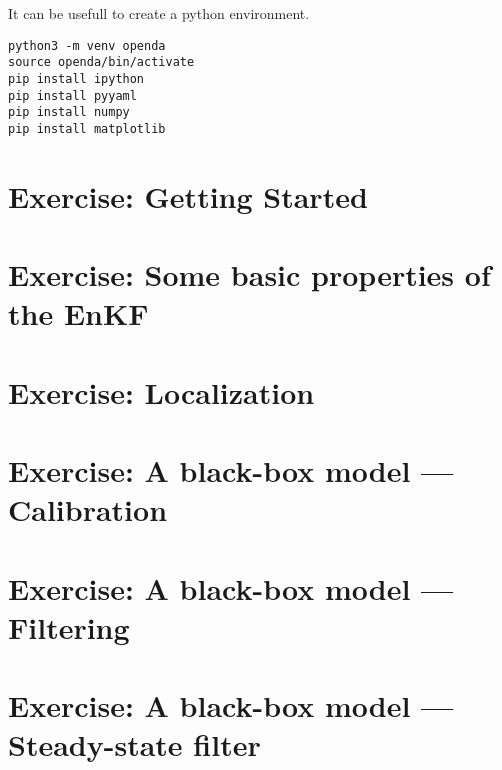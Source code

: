 \documentclass[a4paper,10pt]{article}
\begin{document}
It can be usefull to create a python environment.
\begin{lstlisting}[style=PythonStyle,caption={bash}]
python3 -m venv openda  
source openda/bin/activate
pip install ipython
pip install pyyaml
pip install numpy 
pip install matplotlib

\end{lstlisting}



\section{Exercise: Getting Started}


\section{Exercise: Some basic properties of the EnKF}


%


\section{Exercise: Localization}


\section{Exercise:  A black-box model --- Calibration}
\newcommand{\opgave}{exercise\_black\_box\_calibration\_polution}




\section{Exercise: A black-box model --- Filtering}
\renewcommand{\opgave}{exercise\_black\_box\_enkf\_polution}


\section{Exercise: A black-box model --- Steady-state filter}


%
\end{document}
